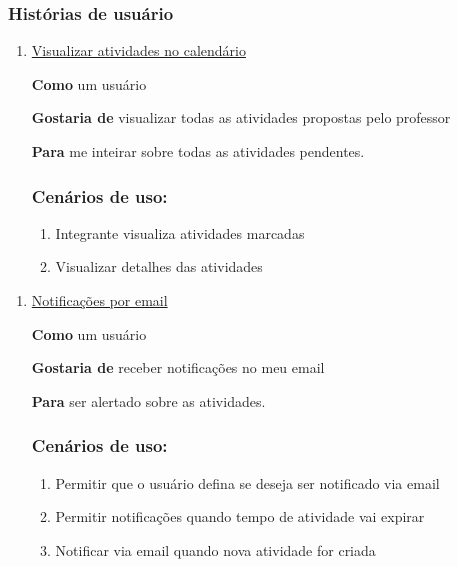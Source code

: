 \subsubsection*{Histórias de usuário}
\begin{enumerate}
\item \underline{Visualizar atividades no calendário}

\textbf{Como} um usuário

\textbf{Gostaria de} visualizar todas as atividades propostas pelo professor

\textbf{Para} me inteirar sobre todas as atividades pendentes.

\subsubsection*{Cenários de uso:}
  \begin{enumerate}
  \item Integrante visualiza atividades marcadas
  \item Visualizar detalhes das atividades
  \end{enumerate}
\end{enumerate}

\begin{enumerate}
\item \underline{Notificações por email}

\textbf{Como} um usuário

\textbf{Gostaria de} receber notificações no meu email

\textbf{Para} ser alertado sobre as atividades.

\subsubsection*{Cenários de uso:}
  \begin{enumerate}
  \item Permitir que o usuário defina se deseja ser notificado via email
  \item Permitir notificações quando tempo de atividade vai expirar
  \item Notificar via email quando nova atividade for criada
  \end{enumerate}
\end{enumerate}


